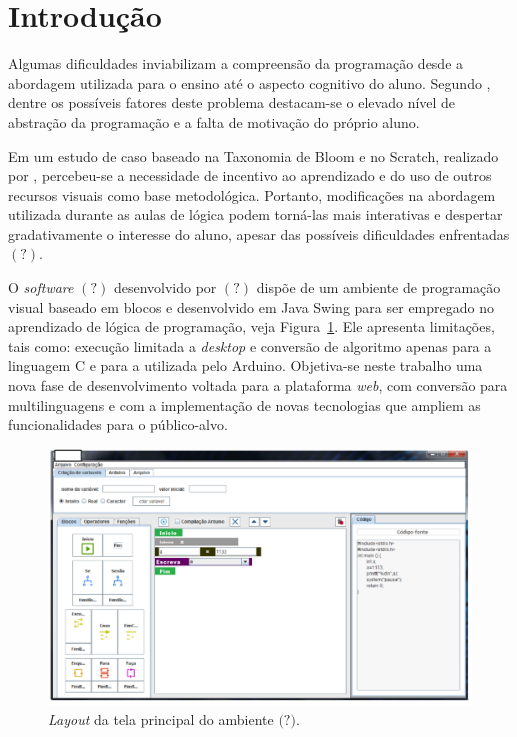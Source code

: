 \documentclass[12pt]{article}
\begin{document}
\section{Introdução} 
Algumas dificuldades inviabilizam a compreensão da programação desde a abordagem utilizada para o ensino até o aspecto cognitivo do aluno. Segundo \cite{GOMES:2008}, dentre os possíveis fatores deste problema destacam-se o elevado nível de abstração da programação e a falta de motivação do próprio aluno. 
\par Em um estudo de caso baseado na Taxonomia de Bloom e no Scratch, realizado por \cite{ARAUJO:2013}, percebeu-se a necessidade de incentivo ao aprendizado e do uso de outros recursos visuais como base metodológica. Portanto, modificações na abordagem utilizada durante as aulas de lógica podem torná-las mais interativas e despertar gradativamente o interesse do aluno, apesar das possíveis dificuldades enfrentadas $(?)$.
\par O \textit{software} $(?)$ desenvolvido por $(?)$ dispõe de um ambiente de programação visual baseado em blocos e desenvolvido em Java Swing para ser empregado no aprendizado de lógica de programação, veja Figura~\ref{fig1}. Ele apresenta limitações, tais como: execução limitada a \textit{desktop} e conversão de algoritmo apenas para a linguagem C e para a utilizada pelo Arduino. Objetiva-se neste trabalho uma nova fase de desenvolvimento voltada para a plataforma \textit{web}, com conversão para multilinguagens e com a implementação de novas tecnologias que ampliem as funcionalidades para o público-alvo.
	\begin{figure}[h]
		\centering
		\includegraphics[scale=0.4]{2017.png}
		\caption{\textit{Layout} da tela principal do ambiente $\textbf{(?)}$.}
		\label{fig1}
	\end{figure}
	
\end{document}
